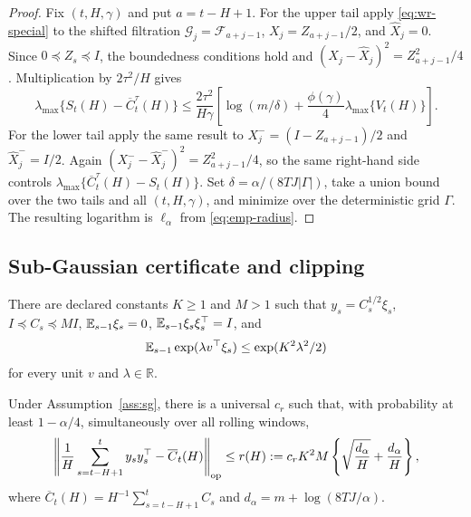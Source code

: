 \begin{proof}
Fix $(t,H,\gamma)$ and put $a=t-H+1$.  For the upper tail apply \eqref{eq:wr-special} to the shifted filtration $\mathcal G_j=\mathcal F_{a+j-1}$, $X_j=Z_{a+j-1}/2$, and $\widehat X_j=0$.  Since $0\preceq Z_s\preceq I$, the boundedness conditions hold and $(X_j-\widehat X_j)^2=Z_{a+j-1}^2/4$.  Multiplication by $2\tau^2/H$ gives
\begin{equation}
 \lambda_{\max}\{S_t(H)-\overline C_t^\tau(H)\}
 \le \frac{2\tau^2}{H\gamma}\left[\log(m/\delta)+\frac{\phi(\gamma)}4\lambda_{\max}\{V_t(H)\}\right].
\end{equation}
For the lower tail apply the same result to $X_j^-=(I-Z_{a+j-1})/2$ and $\widehat X_j^-=I/2$.  Again $(X_j^--\widehat X_j^-)^2=Z_{a+j-1}^2/4$, so the same right-hand side controls $\lambda_{\max}\{\overline C_t^\tau(H)-S_t(H)\}$.  Set $\delta=\alpha/(8TJ|\Gamma|)$, take a union bound over the two tails and all $(t,H,\gamma)$, and minimize over the deterministic grid $\Gamma$.  The resulting logarithm is $\ell_\alpha$ from \eqref{eq:emp-radius}.  \end{proof}

\subsection{Sub-Gaussian certificate and clipping}

\begin{assumption}
\label{ass:sg}
There are declared constants $K\ge1$ and $M>1$ such that $y_s=C_s^{1/2}\xi_s$, $I\preceq C_s\preceq MI$, $\mathbb E_{s-1}\xi_s=0$, $\mathbb E_{s-1}\xi_s\xi_s^\top=I$, and
\begin{equation}
 \mathbb E_{s-1}\exp(\lambda v^\top\xi_s)\le\exp(K^2\lambda^2/2)
\end{equation}
for every unit $v$ and $\lambda\in\mathbb R$.
\end{assumption}

\begin{lemma}
\label{lem:det-radius}
Under Assumption~\ref{ass:sg}, there is a universal $c_r$ such that, with probability at least $1-\alpha/4$, simultaneously over all rolling windows,
\begin{equation}
 \left\|\frac1H\sum_{s=t-H+1}^t y_sy_s^\top-\overline C_t(H)\right\|_{\mathrm{op}}
 \le r(H):=c_rK^2M\left\{\sqrt{\frac{d_\alpha}{H}}+\frac{d_\alpha}{H}\right\},
 \label{eq:det-radius-app}
\end{equation}
where $\overline C_t(H)=H^{-1}\sum_{s=t-H+1}^t C_s$ and $d_\alpha=m+\log(8TJ/\alpha)$.
\end{lemma}

